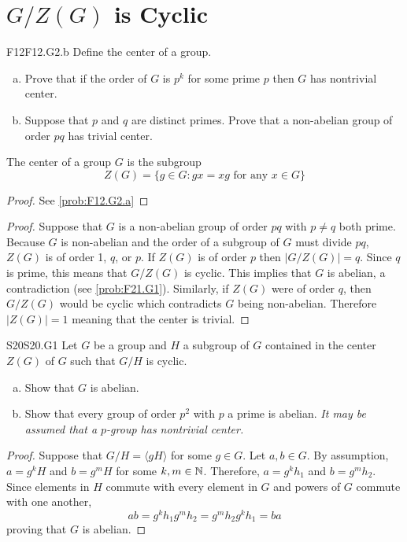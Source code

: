 \documentclass[../AlgebraQualSolutions.tex]{subfiles}
\begin{document}
\section{$G/Z(G)$ is Cyclic}

	\begin{prob}{F12}{F12.G2.b}
	Define the center of a group.
	\begin{enumerate}[(a)]
	\item Prove that if the order of $G$ is $p^k$ for some prime $p$ then $G$ has nontrivial center.
	\item Suppose that $p$ and $q$ are distinct primes. Prove that a non-abelian group of order $pq$ has trivial center.
	\end{enumerate}
	\end{prob}
	
	The center of a group $G$ is the subgroup
		\[Z(G) = \{g \in G: gx = xg \textrm{ for any $x \in G$} \} \]
	
	\begin{proof}
		See \ref{prob:F12.G2.a}
	\end{proof}

	\begin{proof}
		Suppose that $G$ is a non-abelian group of order $pq$ with $p \neq q$ both prime. Because $G$ is non-abelian and the order of a subgroup of $G$ must divide $pq$, $Z(G)$ is of order 1, $q$, or $p$. If $Z(G)$ is of order $p$ then $|G/Z(G)| = q$. Since $q$ is prime, this means that $G/Z(G)$ is cyclic. This implies that $G$ is abelian, a contradiction (see \ref{prob:F21.G1}). Similarly, if $Z(G)$ were of order $q$, then $G/Z(G)$ would be cyclic which contradicts $G$ being non-abelian. Therefore $|Z(G)| = 1$ meaning that the center is trivial.
	\end{proof}

	\begin{prob}{S20}{S20.G1}
	Let $G$ be a group and $H$ a subgroup of $G$ contained in the center $Z(G)$ of $G$ such that $G/H$ is cyclic.
	\begin{enumerate}[(a)]
	\item Show that $G$ is abelian.
	\item Show that every group of order $p^2$ with $p$ a prime is abelian. \emph{It may be assumed that a $p$-group has nontrivial center.}
	\end{enumerate}
	\end{prob}
	
	\begin{proof}
	Suppose that $G/H = \langle gH \rangle$ for some $g \in G$. Let $a, b \in G$. By assumption, $a = g^kH$ and $b = g^mH$ for some $k,m \in \mathbb{N}$. Therefore, $a = g^kh_1$ and $b= g^m h_2$. Since elements in $H$ commute with every element in $G$ and powers of $G$ commute with one another,
		\[ab = g^kh_1g^mh_2 = g^mh_2g^k h_1 = ba \]
	proving that $G$ is abelian.
	\end{proof}
	
\end{document}
